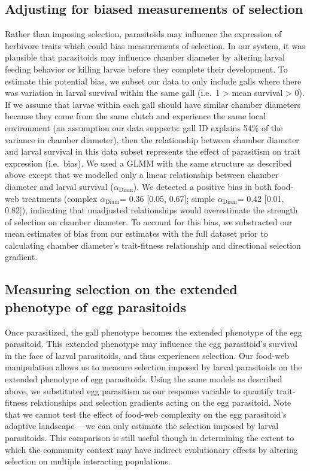 \documentclass[11pt,]{article}
\begin{document}
\subsection{Adjusting for biased measurements of
selection}\label{adjusting-for-biased-measurements-of-selection}

Rather than imposing selection, parasitoids may influence the expression
of herbivore traits which could bias measurements of selection. In our
system, it was plausible that parasitoids may influence chamber diameter
by altering larval feeding behavior or killing larvae before they
complete their development. To estimate this potential bias, we subset
our data to only include galls where there was variation in larval
survival within the same gall (i.e.~1 \textgreater{} mean survival
\textgreater{} 0). If we assume that larvae within each gall should have
similar chamber diameters because they come from the same clutch and
experience the same local environment (an assumption our data supports:
gall ID explains 54\% of the variance in chamber diameter), then the
relationship between chamber diameter and larval survival in this data
subset represents the effect of parasitism on trait expression
(i.e.~bias). We used a GLMM with the same structure as described above
except that we modelled only a linear relationship between chamber
diameter and larval survival (\(\alpha_{\text{Diam}}\)). We detected a
positive bias in both food-web treatments (complex
\(\alpha_{\text{Diam}}\)= 0.36 {[}0.05, 0.67{]}; simple
\(\alpha_{\text{Diam}}\)= 0.42 {[}0.01, 0.82{]}), indicating that
unadjusted relationships would overestimate the strength of selection on
chamber diameter. To account for this bias, we substracted our mean
estimates of bias from our estimates with the full dataset prior to
calculating chamber diameter's trait-fitness relationship and
directional selection gradient.

\subsection{Measuring selection on the extended phenotype of egg
parasitoids}\label{measuring-selection-on-the-extended-phenotype-of-egg-parasitoids}

Once parasitized, the gall phenotype becomes the extended phenotype of
the egg parasitoid. This extended phenotype may influence the egg
parasitoid's survival in the face of larval parasitoids, and thus
experiences selection. Our food-web manipulation allows us to measure
selection imposed by larval parasitoids on the extended phenotype of egg
parasitoids. Using the same models as described above, we substituted
egg parasitism as our response variable to quantify trait-fitness
relationships and selection gradients acting on the egg parasitoid. Note
that we cannot test the effect of food-web complexity on the egg
parasitoid's adaptive landscape ---we can only estimate the selection
imposed by larval parasitoids. This comparison is still useful though in
determining the extent to which the community context may have indirect
evolutionary effects by altering selection on multiple interacting
populations.
\end{document}
